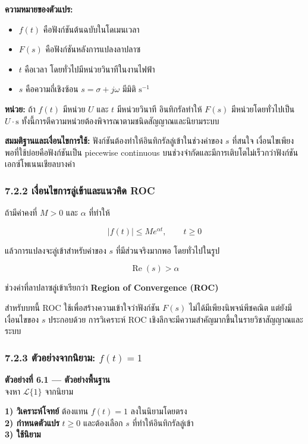 \textbf{ความหมายของตัวแปร:}

\begin{itemize}
    \item $f(t)$ คือฟังก์ชันต้นฉบับในโดเมนเวลา
    \item $F(s)$ คือฟังก์ชันหลังการแปลงลาปลาซ
    \item $t$ คือเวลา โดยทั่วไปมีหน่วยวินาทีในงานไฟฟ้า
    \item $s$ คือความถี่เชิงซ้อน $s=\sigma+j\omega$ มีมิติ $\mathrm{s}^{-1}$
\end{itemize}

\textbf{หน่วย:} ถ้า $f(t)$ มีหน่วย $U$ และ $t$ มีหน่วยวินาที อินทิกรัลทำให้ $F(s)$ มีหน่วยโดยทั่วไปเป็น $U\cdot\mathrm{s}$ ทั้งนี้การตีความหน่วยต้องพิจารณาตามชนิดสัญญาณและนิยามระบบ

\textbf{สมมติฐานและเงื่อนไขการใช้:} ฟังก์ชันต้องทำให้อินทิกรัลลู่เข้าในช่วงค่าของ $s$ ที่สนใจ เงื่อนไขเพียงพอที่ใช้บ่อยคือฟังก์ชันเป็น piecewise continuous บนช่วงจำกัดและมีการเติบโตไม่เร็วกว่าฟังก์ชันเอกซ์โพเนนเชียลบางค่า

\subsubsection{7.2.2 เงื่อนไขการลู่เข้าและแนวคิด ROC}

ถ้ามีค่าคงที่ $M>0$ และ $\alpha$ ที่ทำให้

\[
|f(t)|\le Me^{\alpha t},\qquad t\ge 0
\]

แล้วการแปลงจะลู่เข้าสำหรับค่าของ $s$ ที่มีส่วนจริงมากพอ โดยทั่วไปในรูป

\[
\operatorname{Re}(s)>\alpha
\]

ช่วงค่าที่ลาปลาซลู่เข้าเรียกว่า \textbf{Region of Convergence (ROC)}

สำหรับบทนี้ ROC ใช้เพื่อสร้างความเข้าใจว่าฟังก์ชัน $F(s)$ ไม่ได้มีเพียงนิพจน์พีชคณิต แต่ยังมีเงื่อนไขของ $s$ ประกอบด้วย การวิเคราะห์ ROC เชิงลึกจะมีความสำคัญมากขึ้นในรายวิชาสัญญาณและระบบ

\subsubsection{\texorpdfstring{7.2.3 ตัวอย่างจากนิยาม: $f(t)=1$}{7.2.3 ตัวอย่างจากนิยาม: f(t)=1}}

\textbf{ตัวอย่างที่ 6.1 — ตัวอย่างพื้นฐาน}\\
จงหา $\mathcal{L}\{1\}$ จากนิยาม

\textbf{1) วิเคราะห์โจทย์} ต้องแทน $f(t)=1$ ลงในนิยามโดยตรง\\
\textbf{2) กำหนดตัวแปร} $t\ge 0$ และต้องเลือก $s$ ที่ทำให้อินทิกรัลลู่เข้า\\
\textbf{3) ใช้นิยาม}

